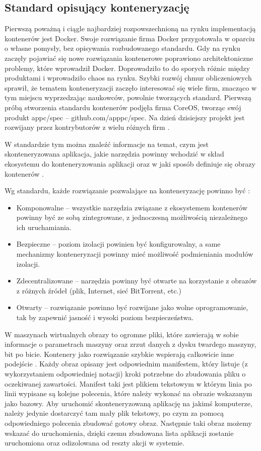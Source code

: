 \documentclass[10pt,a4paper,titlepage,twoside]{report}
\begin{document}
\subsection{Standard opisujący konteneryzację}\indent \indent
Pierwszą poważną i ciągle najbardziej rozpowszechnioną na rynku implementacją kontenerów jest Docker\cite{ad22}. Swoje rozwiązanie firma Docker przygotowała w oparciu o własne pomysły, bez opisywania rozbudowanego standardu. Gdy na rynku zaczęły pojawiać się nowe rozwiązania kontenerowe poprawiono architektoniczne problemy, które wprowadził Docker. Doprowadziło to do sporych różnic między produktami i wprowadziło chaos na rynku. Szybki rozwój chmur obliczeniowych sprawił, że tematem konteneryzacji zaczęło interesować się wiele firm, znacząco w tym miejscu wyprzedzając naukowców, powolnie tworzących standard. Pierwszą próbą stworzenia standardu kontenerów podjęła firma CoreOS, tworząc swój produkt appc/spec – github.com/apppc/spec. Na dzień dzisiejszy projekt jest rozwijany przez kontrybutorów z wielu różnych firm \cite{ad23}. 

\indent \indent W standardzie tym można znaleźć informacje na temat, czym jest skonteneryzowana aplikacja, jakie narzędzia powinny wchodzić w skład ekosystemu do konteneryzowania aplikacji oraz w jaki sposób definiuje się obrazy kontenerów \cite{ad23}.

\indent \indent Wg standardu, każde rozwiązanie pozwalające na konteneryzację powinno być \cite{ad23}:
\begin{itemize}
	\item Komponowalne – wszystkie narzędzia związane z ekosystemem kontenerów powinny być ze sobą zintegrowane, z jednoczesną możliwością niezależnego ich uruchamiania.
	\item Bezpieczne – poziom izolacji powinien być konfigurowalny, a same mechanizmy konteneryzacji powinny mieć możliwość podmieniania modułów izolacji.
	\item Zdecentralizowane – narzędzia powinny być otwarte na korzystanie z obrazów z różnych źródeł (plik, Internet, sieć BitTorrent, etc.)
	\item Otwarty – rozwiązanie powinno być rozwijane jako wolne oprogramowanie, tak by zapewnić jasność i wysoki poziom bezpieczeństwa.
\end{itemize}

W maszynach wirtualnych obrazy to ogromne pliki, które zawierają w sobie informacje o parametrach maszyny oraz zrzut danych z dysku twardego maszyny, bit po bicie. Kontenery jako rozwiązanie szybkie wspierają całkowicie inne podejście \cite{ad24}. Każdy obraz opisany jest odpowiednim manifestem, który listuje (z wykorzystaniem odpowiedniej notacji) kroki potrzebne do zbudowania pliku o oczekiwanej zawartości. Manifest taki jest plikiem tekstowym w którym linia po linii wypisane są kolejne polecenia, które należy wykonać na obrazie wskazanym jako bazowy. Aby uruchomić skonteneryzowaną aplikację na jakimś komputerze, należy jedynie dostarczyć tam mały plik tekstowy, po czym za pomocą odpowiedniego polecenia zbudować gotowy obraz. Następnie taki obraz możemy wskazać do uruchomienia, dzięki czemu zbudowana lista aplikacji zostanie uruchomiona oraz odizolowana od reszty akcji w systemie.
\end{document}
